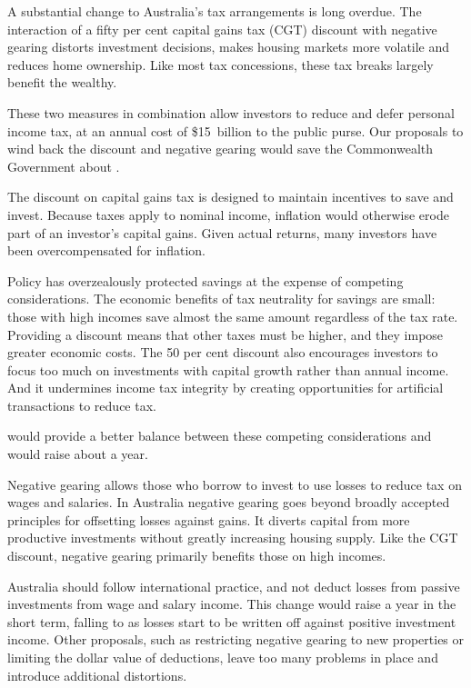 \documentclass{grattan}\usepackage[]{graphicx}\usepackage[]{color}
\begin{document}
\newlength{\overviewextra}
\setlength{\overviewextra}{-2pt}
\addtolength{\columnsep}{\overviewextra}
\begin{overview}[-25pt] %
A substantial change to Australia's tax arrangements is long overdue. The interaction of a fifty per cent capital gains tax (CGT) discount with negative gearing distorts investment decisions, makes housing markets more volatile and reduces home ownership. Like most tax concessions, these tax breaks largely benefit the wealthy.

These two measures in combination allow investors to reduce and defer personal income tax, at an annual cost of \$15~billion to the public purse. Our proposals to wind back the discount and negative gearing would save the Commonwealth Government about . 

The discount on capital gains tax is designed to maintain incentives to save and invest.  Because taxes apply to nominal income, inflation would otherwise erode part of an investor's capital gains. Given actual returns, many investors have been overcompensated for inflation. 

Policy has overzealously protected savings at the expense of competing considerations. The economic benefits of tax neutrality for savings are small: those with high incomes save almost the same amount regardless of the tax rate. Providing a discount means that other taxes must be higher, and they impose greater economic costs. The 50 per cent discount also encourages investors to focus too much on investments with capital growth rather than annual income. And it undermines income tax integrity by creating opportunities for artificial transactions to reduce tax. 

 would provide a better balance between these competing considerations and would raise about  a year.

Negative gearing allows those who borrow to invest to use losses to reduce tax on wages and salaries. In Australia negative gearing goes beyond broadly accepted principles for offsetting losses against gains. It diverts capital from more productive investments without greatly increasing housing supply. Like the CGT discount, negative gearing primarily benefits those on high incomes.

Australia should follow international practice, and not deduct losses from passive investments from wage and salary income.  This change would raise  a year in the short term, falling to  as losses start to be written off against positive investment income. Other proposals, such as restricting negative gearing to new properties or limiting the dollar value of deductions, leave too many problems in place and introduce additional distortions. 


\end{overview}
\end{document}
